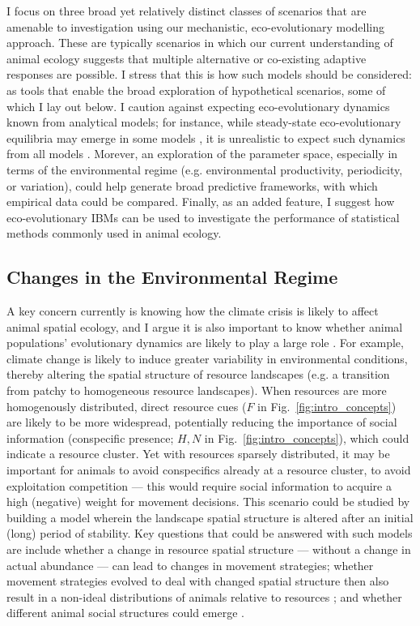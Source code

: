 I focus on three broad yet relatively distinct classes of scenarios that are amenable to investigation using our mechanistic, eco-evolutionary modelling approach.
These are typically scenarios in which our current understanding of animal ecology suggests that multiple alternative or co-existing adaptive responses are possible.
I stress that this is how such models should be considered: as tools that enable the broad exploration of hypothetical scenarios, some of which I lay out below.
I caution against expecting eco-evolutionary dynamics known from analytical models; for instance, while steady-state eco-evolutionary equilibria may emerge in some models \parencite[e.g.][]{gupte2021a,gupte2022c,getz2015,getz2016}, it is unrealistic to expect such dynamics from all models \parencite[see e.g.][]{netz2021}.
Morever, an exploration of the parameter space, especially in terms of the environmental regime (e.g. environmental productivity, periodicity, or variation), could help generate broad predictive frameworks, with which empirical data could be compared.
Finally, as an added feature, I suggest how eco-evolutionary IBMs can be used to investigate the performance of statistical methods commonly used in animal ecology.

\subsection*{Changes in the Environmental Regime}

A key concern currently is knowing how the climate crisis is likely to affect animal spatial ecology, and I argue it is also important to know whether animal populations' evolutionary dynamics are likely to play a large role \parencite[e.g.][]{botero2015}.
For example, climate change is likely to induce greater variability in environmental conditions, thereby altering the spatial structure of resource landscapes (e.g. a transition from patchy to homogeneous resource landscapes).
When resources are more homogenously distributed, direct resource cues ($F$ in Fig.~\ref{fig:intro_concepts}) are likely to be more widespread, potentially reducing the importance of social information (conspecific presence; $H, N$ in Fig.~\ref{fig:intro_concepts}), which could indicate a resource cluster.
Yet with resources sparsely distributed, it may be important for animals to avoid conspecifics already at a resource cluster, to avoid exploitation competition --- this would require social information to acquire a high (negative) weight for movement decisions.
This scenario could be studied by building a model wherein the landscape spatial structure is altered after an initial (long) period of stability.
Key questions that could be answered with such models are include whether a change in resource spatial structure --- without a change in actual abundance --- can lead to changes in movement strategies; whether movement strategies evolved to deal with changed spatial structure then also result in a non-ideal distributions of animals relative to resources \parencite[a test of][]{fretwell1970,parker1978}; and whether different animal social structures could emerge \parencite[see][]{webber2022,tanner2012}.

